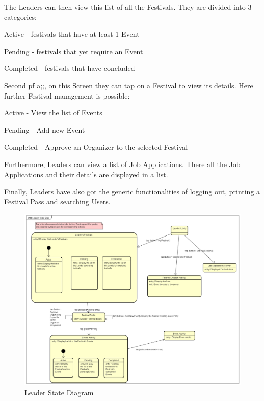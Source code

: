 			The Leaders can then view this list of all the Festivals. They are divided into 3 categories:
			\begin{packed_enum}
				\item Active - festivals that have at least 1 Event
				\item Pending - festivals that yet require an Event
				\item Completed - festivals that have concluded
			\end{packed_enum}
		
			Second pf a;;, on this Screen they can tap on a Festival to view its details. Here further Festival management is possible:
			\begin{packed_enum}
				\item Active - View the list of Events
				\item Pending - Add new Event
				\item Completed - Approve an Organizer to the selected Festival
			\end{packed_enum}
		
			Furthermore, Leaders can view a list of Job Applications. There all the Job Applications and their details are displayed in a list.
			
			Finally, Leaders have also got the generic functionalities of logging out, printing a Festival Pass and searching Users.
			
			 \begin{figure}[H]
			 	\includegraphics[width=\linewidth]{diagrams/Leader State Diag.png}
			 	\caption{Leader State Diagram}
			 	\label{fig:leader_state_diag}
			 \end{figure}
			\eject
			  
